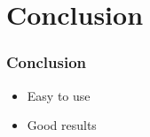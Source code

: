 \documentclass{beamer}
\begin{document}
\section{Conclusion}

\begin{frame}
  \frametitle{Conclusion}

  \begin{itemize}
    \item Easy to use
    \item Good results
  \end{itemize}
\end{frame}
\end{document}
